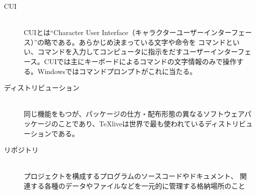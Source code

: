 \documentclass[titlepage]{ltjsarticle}
\begin{document}
\begin{description}
    \item[CUI]~\\
      CUIとは``Character User Interface（キャラクターユーザーインターフェース）''の略である。あらかじめ決まっている文字や命令を コマンドといい、コマンドを入力してコンピュータに指示をだすユーザーインターフェース。CUIでは主にキーボードによるコマンドの文字情報のみで操作する。Windowsではコマンドプロンプトがこれに当たる。
    \item[ディストリビューション]~\\
    同じ機能をもつが、パッケージの仕方・配布形態の異なるソフトウェアパッケージのことであり、TeXliveは世界で最も使われているディストリビューションである。
   

  \item [リポジトリ] ~\\
    プロジェクトを構成するプログラムのソースコードやドキュメント、
    関連する各種のデータやファイルなどを一元的に管理する格納場所のこと
\end{description}
\end{document}
